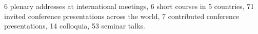 \documentclass[11pt]{article}
\begin{document}
6 plenary addresses at international meetings,
6 short courses in 5 countries,
71 invited conference presentations across the world,
7 contributed conference presentations,
14 colloquia,
53 seminar talks.


\end{document}
